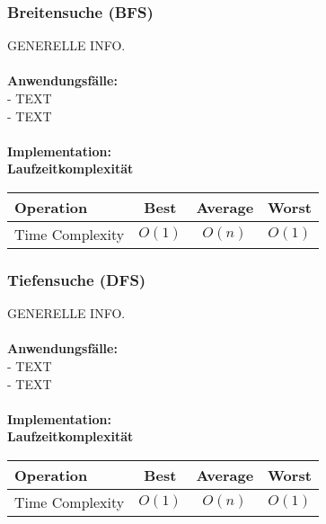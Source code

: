 \documentclass[../main.tex]{subfiles}
\begin{document}
	\subsubsection{Breitensuche (BFS)}
	GENERELLE INFO. \\\\
	\textbf{Anwendungsfälle:}\\
	- TEXT\\
	- TEXT\\\\
	\textbf{Implementation:}\\
	 
	\textbf{Laufzeitkomplexität}\\
	\begin{table}[ht]
		\centering
		\begin{tabular}{l *{3}{c}}
			\toprule
			Operation & Best & Average & Worst\\
			\midrule
			Time Complexity & $O(1)$ & $O(n)$ & $O(1)$\\
			\bottomrule
		\end{tabular}
	\end{table}
	\clearpage
	
	\subsubsection{Tiefensuche (DFS)}
	GENERELLE INFO. \\\\
	\textbf{Anwendungsfälle:}\\
	- TEXT\\
	- TEXT\\\\
	\textbf{Implementation:}\\
	 
	\textbf{Laufzeitkomplexität}\\
	\begin{table}[ht]
		\centering
		\begin{tabular}{l *{3}{c}}
			\toprule
			Operation & Best & Average & Worst\\
			\midrule
			Time Complexity & $O(1)$ & $O(n)$ & $O(1)$\\
			\bottomrule
		\end{tabular}
	\end{table}
	\clearpage
	
\end{document}
